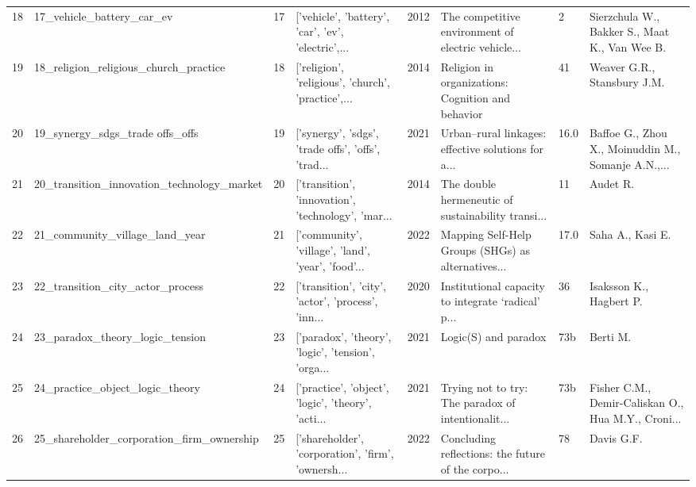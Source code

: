 \begin{tabular}{rlrlrlll}
         18 &                          17\_vehicle\_battery\_car\_ev &        17 & ['vehicle', 'battery', 'car', 'ev', 'electric',... &          2012 & The competitive environment of electric vehicle... &       2 &      Sierzchula W., Bakker S., Maat K., Van Wee B. \\
         19 &              18\_religion\_religious\_church\_practice &        18 & ['religion', 'religious', 'church', 'practice',... &          2014 &  Religion in organizations: Cognition and behavior &      41 &                        Weaver G.R., Stansbury J.M. \\
         20 &                    19\_synergy\_sdgs\_trade offs\_offs &        19 & ['synergy', 'sdgs', 'trade offs', 'offs', 'trad... &          2021 & Urban–rural linkages: effective solutions for a... &    16.0 & Baffoe G., Zhou X., Moinuddin M., Somanje A.N.,... \\
         21 &         20\_transition\_innovation\_technology\_market &        20 & ['transition', 'innovation', 'technology', 'mar... &          2014 & The double hermeneutic of sustainability transi... &      11 &                                           Audet R. \\
         22 &                     21\_community\_village\_land\_year &        21 & ['community', 'village', 'land', 'year', 'food'... &          2022 & Mapping Self-Help Groups (SHGs) as alternatives... &    17.0 &                                   Saha A., Kasi E. \\
         23 &                   22\_transition\_city\_actor\_process &        22 & ['transition', 'city', 'actor', 'process', 'inn... &          2020 & Institutional capacity to integrate ‘radical’ p... &      36 &                            Isaksson K., Hagbert P. \\
         24 &                    23\_paradox\_theory\_logic\_tension &        23 & ['paradox', 'theory', 'logic', 'tension', 'orga... &          2021 &                               Logic(S) and paradox &     73b &                                           Berti M. \\
         25 &                    24\_practice\_object\_logic\_theory &        24 & ['practice', 'object', 'logic', 'theory', 'acti... &          2021 & Trying not to try: The paradox of intentionalit... &     73b & Fisher C.M., Demir-Caliskan O., Hua M.Y., Croni... \\
         26 &          25\_shareholder\_corporation\_firm\_ownership &        25 & ['shareholder', 'corporation', 'firm', 'ownersh... &          2022 & Concluding reflections: the future of the corpo... &      78 &                                         Davis G.F. \\

\end{tabular}
